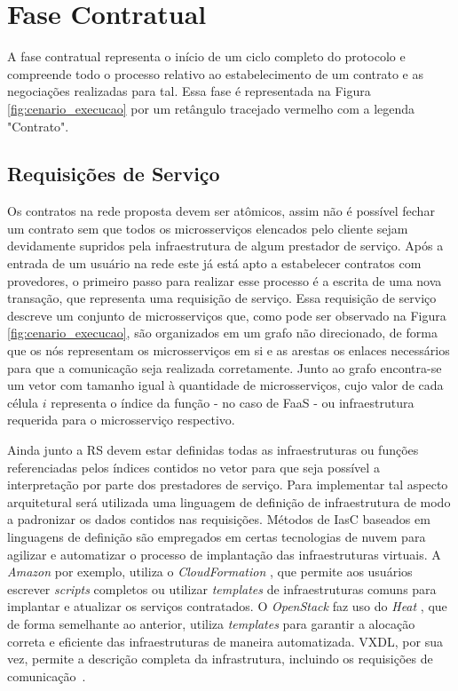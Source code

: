 
\section{Fase Contratual}
\label{sec:proposta:fase_contratual}

A fase contratual representa o início de um ciclo completo do protocolo e compreende todo o processo relativo ao estabelecimento de um contrato e as negociações realizadas para tal. Essa fase é representada na Figura \ref{fig:cenario_execucao} por um retângulo tracejado vermelho com a legenda "Contrato".


\subsection{Requisições de Serviço}
\label{subsec:proposta:contratual:rs}
%
Os contratos na rede proposta devem ser atômicos, assim não é possível fechar um contrato sem que todos os microsserviços elencados pelo cliente sejam devidamente supridos pela infraestrutura de algum prestador de serviço. Após a entrada de um usuário na rede este já está apto a estabelecer contratos com provedores, o primeiro passo para realizar esse processo é a escrita de uma nova transação, que representa uma requisição de serviço. Essa requisição de serviço descreve um conjunto de microsserviços que, como pode ser observado na Figura \ref{fig:cenario_execucao}, são organizados em um grafo não direcionado, de forma que os nós representam os microsserviços em si e as arestas os enlaces necessários para que a comunicação seja realizada corretamente. Junto ao grafo encontra-se um vetor com tamanho igual à quantidade de microsserviços, cujo valor de cada célula $i$ representa o índice da função - no caso de \ac{FaaS} - ou infraestrutura  requerida para o microsserviço respectivo.


Ainda junto a \ac{RS} devem estar definidas todas as infraestruturas ou funções referenciadas pelos índices contidos no vetor para que seja possível a interpretação por parte dos prestadores de serviço. Para implementar tal aspecto arquitetural será utilizada uma linguagem de definição de infraestrutura de modo a padronizar os dados contidos nas requisições. Métodos de \ac{IasC} baseados em linguagens de definição são empregados em certas tecnologias de nuvem para agilizar e automatizar o processo de implantação das infraestruturas virtuais. A \textit{Amazon} por exemplo, utiliza o \textit{CloudFormation} \cite{nuvem_sla:cloudformation}, que permite aos usuários escrever \textit{scripts} completos ou utilizar \textit{templates} de infraestruturas comuns para implantar e atualizar os serviços contratados. O \textit{OpenStack} faz uso do \textit{Heat} \cite{nuvem_sla:heat}, que de forma semelhante ao anterior, utiliza \textit{templates} para garantir a alocação correta e eficiente das infraestruturas de maneira automatizada.
VXDL, por sua vez, permite a descrição completa da infrastrutura, incluindo os requisições de comunicação~\cite{nuvem_sla:vxdl}.

